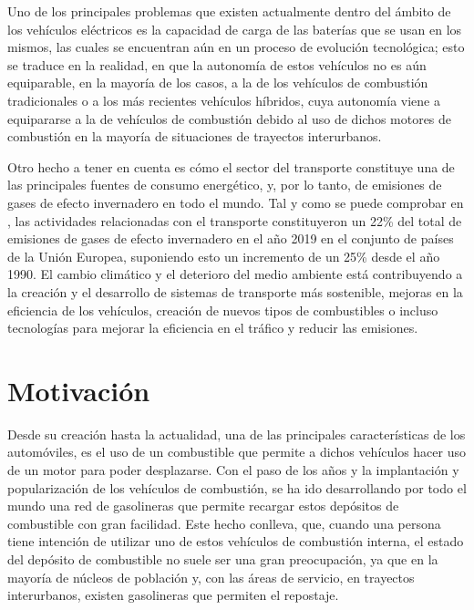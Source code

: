 \documentclass[11pt,spanish,listoffigures,listoftables]{tfgetsinf}
\begin{document}
Uno de los principales problemas que existen actualmente dentro del ámbito de los vehículos eléctricos es la capacidad de carga de las baterías que se usan en los mismos, las cuales se encuentran aún en un proceso de evolución tecnológica; esto se traduce en la realidad, en que la autonomía de estos vehículos no es aún equiparable, en la mayoría de los casos, a la de los vehículos de combustión tradicionales o a los más recientes vehículos híbridos, cuya autonomía viene a equipararse a la de vehículos de combustión debido al uso de dichos motores de combustión en la mayoría de situaciones de trayectos interurbanos.

Otro hecho a tener en cuenta es cómo el sector del transporte constituye una de las principales fuentes de consumo energético, y, por lo tanto, de emisiones de gases de efecto invernadero en todo el mundo. Tal y como se puede comprobar en \cite{EEAPUBL2021066}, las actividades relacionadas con el transporte constituyeron un 22\% del total de emisiones de gases de efecto invernadero en el año 2019 en el conjunto de países de la Unión Europea, suponiendo esto un incremento de un 25\% desde el año 1990. El cambio climático y el deterioro del medio ambiente está contribuyendo a la creación y el desarrollo de sistemas de transporte más sostenible, mejoras en la eficiencia de los vehículos, creación de nuevos tipos de combustibles o incluso tecnologías para mejorar la eficiencia en el tráfico y reducir las emisiones.

\section{Motivación}
Desde su creación hasta la actualidad, una de las principales características de los automóviles, es el uso de un combustible que permite a dichos vehículos hacer uso de un motor para poder desplazarse. Con el paso de los años y la implantación y popularización de los vehículos de combustión, se ha ido desarrollando por todo el mundo una red de gasolineras que permite recargar estos depósitos de combustible con gran facilidad. Este hecho conlleva, que, cuando una persona tiene intención de utilizar uno de estos vehículos de combustión interna, el estado del depósito de combustible no suele ser una gran preocupación, ya que en la mayoría de núcleos de población y, con las áreas de servicio, en trayectos interurbanos, existen gasolineras que permiten el repostaje.
\end{document}

